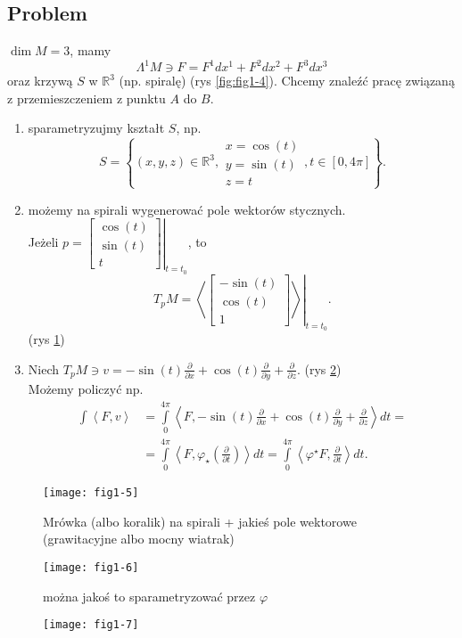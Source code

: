 \documentclass[../main.tex]{subfiles}
\begin{document}
\subsection{Problem}
$\dim M = 3$, mamy
 \[
\Lambda^1M\ni F = F^1dx^1 + F^2dx^2 + F^3dx^3
\]
oraz krzywą $S$ w $\mathbb{R}^3$ (np. spiralę) (rys \ref{fig:fig1-4}). Chcemy znaleźć pracę związaną z przemieszczeniem z punktu $A$ do $B$.
\begin{enumerate}
    \item sparametryzujmy kształt $S$, np.
        \[
            S = \left\{ (x,y,z)\in\mathbb{R}^3, \begin{matrix}x = \cos(t)\\ y = \sin(t)\\ z = t \end{matrix}, t\in \left[ 0, 4\pi \right] \right\}
        .\]
\item możemy na spirali wygenerować pole wektorów stycznych. \\
    Jeżeli $p = \left.\begin{bmatrix} \cos(t)\\ \sin(t)\\ t \end{bmatrix}\right|_{t = t_0} $, to
        \[
            T_pM = \left.\left<\begin{bmatrix} -\sin(t)\\ \cos(t)\\ 1 \end{bmatrix}  \right>\right|_{t = t_0}
                .\] (rys \ref{fig:fig1-5})
        \item Niech $T_pM \ni v = -\sin(t) \frac{\partial }{\partial x} + \cos(t) \frac{\partial }{\partial y} + \frac{\partial }{\partial z}$. (rys \ref{fig:fig1-6})\\
            Możemy policzyć np.
            \begin{align*}
                \int \left<F, v \right> &= \int\limits_{0}^{4\pi} \left<F, -\sin(t)\frac{\partial }{\partial x} + \cos(t) \frac{\partial }{\partial y} + \frac{\partial }{\partial z}  \right> dt = \\
                &= \int\limits_{0}^{4\pi} \left<F, \varphi_\star\left(\frac{\partial }{\partial t} \right) \right>dt = \int\limits_0^{4\pi} \left<\varphi^\star F, \frac{\partial }{\partial t}  \right>dt
            .\end{align*}
\end{enumerate}
\begin{figure}[h]
    \centering
    \texttt{[image: fig1-5]}
    \caption{Mrówka (albo koralik) na spirali + jakieś pole wektorowe (grawitacyjne albo mocny wiatrak)}
    \label{fig:fig1-5}
\end{figure}
\begin{figure}[h]
    \centering
    \texttt{[image: fig1-6]}
    \caption{można jakoś to sparametryzować przez $\varphi$}
    \label{fig:fig1-6}
\end{figure}
\begin{figure}[h]
    \centering
    \texttt{[image: fig1-7]}
    \caption{}
    \label{fig:fig1-7}
\end{figure}
\end{document}
